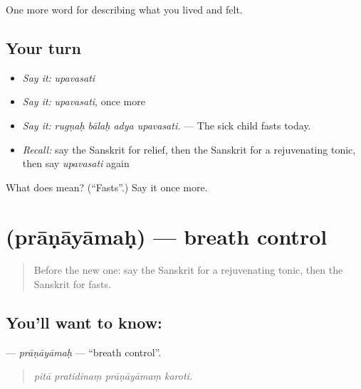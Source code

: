 \begin{grammarlens}[title={What you've built}]
One more word for describing what you lived and felt.
\end{grammarlens}

\subsection*{Your turn}
\begin{itemize}
\raggedright
  \item \emph{Say it:} \emph{upavasati}
  \item \emph{Say it:} \emph{upavasati}, once more
  \item \emph{Say it:} \emph{rugṇaḥ bālaḥ adya upavasati.} — The sick child fasts today.
  \item \emph{Recall:} say the Sanskrit for relief, then the Sanskrit for a rejuvenating tonic, then say \emph{upavasati} again
\end{itemize}

\begin{tcolorbox}[breakable,colback=teal!4,colframe=teal!35!black,title={Before you move on}]
What does  mean? (\textquotedblleft{}Fasts\textquotedblright{}.) Say it once more.
\end{tcolorbox}
\section[\texorpdfstring{\sk{प्राणायामः} (prāṇāyāmaḥ)}{प्राणायामः (prāṇāyāmaḥ)}]{ (prāṇāyāmaḥ) — breath control}

\label{lesson:SA-C486-pranayamah}



\begin{quote}
Before the new one: say the Sanskrit for a rejuvenating tonic, then the Sanskrit for fasts.
\end{quote}

\subsection*{You'll want to know: }
\textbf{} — \emph{prāṇāyāmaḥ} — \textquotedblleft{}breath control\textquotedblright{}.

\begin{quote}
   
\end{quote}

\begin{quote}
\emph{pitā pratidinaṃ prāṇāyāmaṃ karoti.}
\end{quote}

